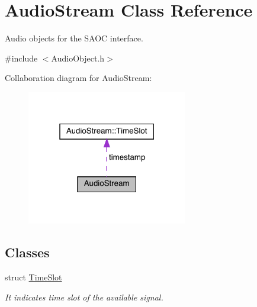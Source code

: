 \hypertarget{class_audio_stream}{}\section{Audio\+Stream Class Reference}
\label{class_audio_stream}


Audio objects for the S\+A\+OC interface.  




{\ttfamily \#include $<$Audio\+Object.\+h$>$}



Collaboration diagram for Audio\+Stream\+:
\nopagebreak
\begin{figure}[H]
\begin{center}
\leavevmode
\includegraphics[width=199pt]{class_audio_stream__coll__graph}
\end{center}
\end{figure}
\subsection*{Classes}
\begin{DoxyCompactItemize}
\item 
struct \hyperlink{struct_audio_stream_1_1_time_slot}{Time\+Slot}
\begin{DoxyCompactList}\small\item\em It indicates time slot of the available signal. \end{DoxyCompactList}\end{DoxyCompactItemize}
